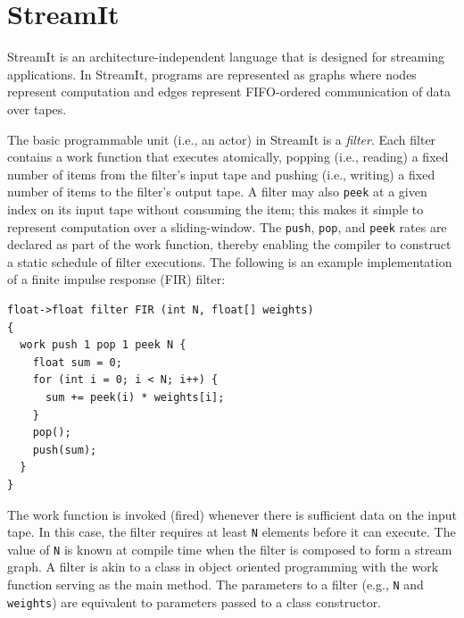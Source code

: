 \section{StreamIt}
\label{sec:streamit}

StreamIt  is   an  architecture-independent  language that is
designed for  streaming applications. In StreamIt, programs are
represented as graphs where  nodes represent  computation and edges
represent FIFO-ordered communication of data over tapes.

The  basic programmable  unit (i.e., an actor) in  StreamIt is a {\it
filter}.   Each filter contains  a work  function that executes
atomically,  popping (i.e., reading)  a fixed number  of items  from
the  filter's input  tape and pushing (i.e., writing) a fixed number
of items to the filter's output tape.  A filter  may also {\tt peek} at
a given index  on its input tape without  consuming  the  item;  this
makes  it  simple  to  represent computation over a
sliding-window.   The {\tt push}, {\tt pop}, and {\tt peek} rates are
declared as part  of  the work  function,  thereby enabling  the
compiler    to construct a static schedule of filter executions. The
following is an example implementation of a finite impulse
response (FIR)  filter: 
{\small
\begin{verbatim}
float->float filter FIR (int N, float[] weights) 
{
  work push 1 pop 1 peek N {
    float sum = 0;
    for (int i = 0; i < N; i++) {
      sum += peek(i) * weights[i];
    }
    pop();
    push(sum);
  }
}
\end{verbatim}}

The work function is invoked (fired) whenever there is sufficient data
on the input tape. In this case, the filter requires at least
\texttt{N} elements before it can execute. The value of \texttt{N} is
known at compile time when the filter is composed to form a stream
graph. A filter is akin to a class in object oriented programming
with the work function serving as the main method. The parameters
to a filter (e.g., \texttt{N} and \texttt{weights}) are equivalent to
parameters passed to a class constructor. 

